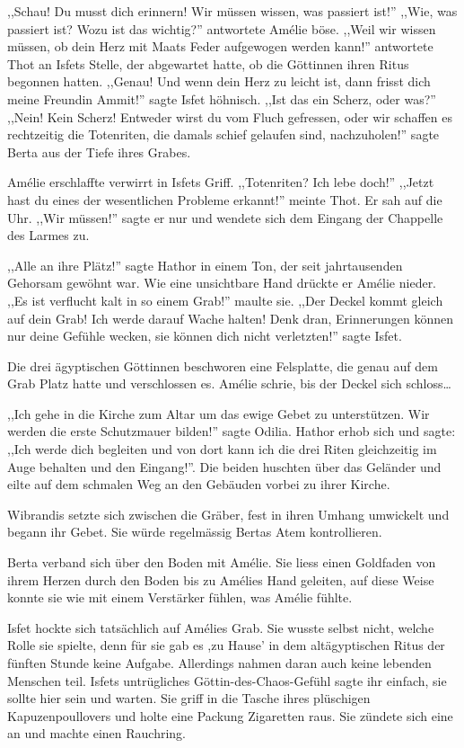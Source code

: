 \documentclass[11pt,titlepage,a5paper]{book}
\begin{document}
,,Schau! Du musst dich erinnern! Wir müssen wissen, was passiert ist!'' ,,Wie, was passiert ist? Wozu ist das wichtig?'' antwortete Amélie böse. ,,Weil wir wissen müssen, ob dein Herz mit Maats Feder aufgewogen werden kann!'' antwortete Thot an Isfets Stelle, der abgewartet hatte, ob die Göttinnen ihren Ritus begonnen hatten. ,,Genau! Und wenn dein Herz zu leicht ist, dann frisst dich meine Freundin Ammit!'' sagte Isfet höhnisch. ,,Ist das ein Scherz, oder was?'' ,,Nein! Kein Scherz! Entweder wirst du vom Fluch gefressen, oder wir schaffen es rechtzeitig die Totenriten, die damals schief gelaufen sind, nachzuholen!'' sagte Berta aus der Tiefe ihres Grabes.

Amélie erschlaffte verwirrt in Isfets Griff. ,,Totenriten? Ich lebe doch!'' ,,Jetzt hast du eines der wesentlichen Probleme erkannt!'' meinte Thot. Er sah auf die Uhr. ,,Wir müssen!'' sagte er nur und wendete sich dem Eingang der Chappelle des Larmes zu.

,,Alle an ihre Plätz!'' sagte Hathor in einem Ton, der seit jahrtausenden Gehorsam gewöhnt war. Wie eine unsichtbare Hand drückte er Amélie nieder. ,,Es ist verflucht kalt in so einem Grab!'' maulte sie. ,,Der Deckel kommt gleich auf dein Grab! Ich werde darauf Wache halten! Denk dran, Erinnerungen können nur deine Gefühle wecken, sie können dich nicht verletzten!'' sagte Isfet. 

Die drei ägyptischen Göttinnen beschworen eine Felsplatte, die genau auf dem Grab Platz hatte und verschlossen es. Amélie schrie, bis der Deckel sich schloss\dots

,,Ich gehe in die Kirche zum Altar um das ewige Gebet zu unterstützen. Wir werden die erste Schutzmauer bilden!'' sagte Odilia. Hathor erhob sich und sagte: ,,Ich werde dich begleiten und von dort kann ich die drei Riten gleichzeitig im Auge behalten und den Eingang!''. Die beiden huschten über das Geländer und eilte auf dem schmalen Weg an den Gebäuden vorbei zu ihrer Kirche.

Wibrandis setzte sich zwischen die Gräber, fest in ihren Umhang umwickelt und begann ihr Gebet. Sie würde regelmässig Bertas Atem kontrollieren.

Berta verband sich über den Boden mit Amélie. Sie liess einen Goldfaden von ihrem Herzen durch den Boden bis zu Amélies Hand geleiten, auf diese Weise konnte sie wie mit einem Verstärker fühlen, was Amélie fühlte.

Isfet hockte sich tatsächlich auf Amélies Grab. Sie wusste selbst nicht, welche Rolle sie spielte, denn für sie gab es ,zu Hause' in dem altägyptischen Ritus der fünften Stunde keine Aufgabe. Allerdings nahmen daran auch keine lebenden Menschen teil. Isfets untrügliches Göttin-des-Chaos-Gefühl sagte ihr einfach, sie sollte hier sein und warten. Sie griff in die Tasche ihres plüschigen Kapuzenpoullovers und holte eine Packung Zigaretten raus. Sie zündete sich eine an und machte einen Rauchring. 
\end{document}
